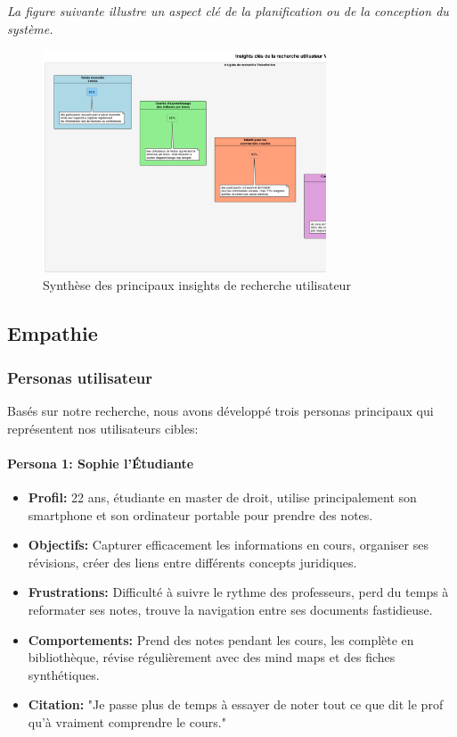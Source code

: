 \noindent
\textit{La figure suivante illustre un aspect clé de la planification ou de la conception du système.}
\begin{figure}[H]
    \centering
    \includegraphics[width=0.75\textwidth]{assets/docs/user_research_insights.png}
    \caption{Synthèse des principaux insights de recherche utilisateur}
    \label{fig:user_research_insights}
\end{figure}

\subsection{Empathie}

\subsubsection{Personas utilisateur}

Basés sur notre recherche, nous avons développé trois personas principaux qui représentent nos utilisateurs cibles:

\paragraph{Persona 1: Sophie l'Étudiante}

\begin{itemize}
    \item \textbf{Profil:} 22 ans, étudiante en master de droit, utilise principalement son smartphone et son ordinateur portable pour prendre des notes.
    \item \textbf{Objectifs:} Capturer efficacement les informations en cours, organiser ses révisions, créer des liens entre différents concepts juridiques.
    \item \textbf{Frustrations:} Difficulté à suivre le rythme des professeurs, perd du temps à reformater ses notes, trouve la navigation entre ses documents fastidieuse.
    \item \textbf{Comportements:} Prend des notes pendant les cours, les complète en bibliothèque, révise régulièrement avec des mind maps et des fiches synthétiques.
    \item \textbf{Citation:} "Je passe plus de temps à essayer de noter tout ce que dit le prof qu'à vraiment comprendre le cours."
\end{itemize}

